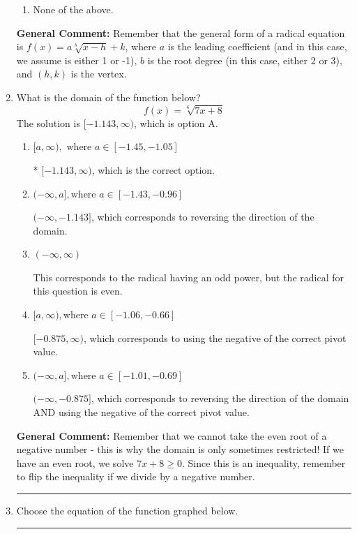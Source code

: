 \documentclass{extbook}[14pt]
\newcommand{\litem}[1]{\item #1

\rule{\textwidth}{0.4pt}}
\begin{document}
\begin{enumerate}
{\begin{enumerate}[label=\Alph*.]
\item None of the above.\end{enumerate}
\textbf{General Comment:} Remember that the general form of a radical equation is $ f(x) = a \sqrt[b]{x - h} + k $, where $a$ is the leading coefficient (and in this case, we assume is either 1 or -1), $b$ is the root degree (in this case, either 2 or 3), and $(h, k)$ is the vertex.
}
\litem{
What is the domain of the function below?
\[ f(x) = \sqrt[6]{7 x + 8} \]The solution is \( [-1.143, \infty) \), which is option A.\begin{enumerate}[label=\Alph*.]
\item \( [a, \infty), \text{ where } a \in [-1.45, -1.05] \)

* $[-1.143, \infty)$, which is the correct option.
\item \( (-\infty, a], \text{where } a \in [-1.43, -0.96] \)

 $(-\infty, -1.143]$, which corresponds to reversing the direction of the domain.
\item \( (-\infty, \infty) \)

This corresponds to the radical having an odd power, but the radical for this question is even.
\item \( [a, \infty), \text{where } a \in [-1.06, -0.66] \)

$[-0.875, \infty)$, which corresponds to using the negative of the correct pivot value.
\item \( (-\infty, a], \text{where } a \in [-1.01, -0.69] \)

$(-\infty, -0.875]$, which corresponds to reversing the direction of the domain AND using the negative of the correct pivot value.
\end{enumerate}

\textbf{General Comment:} Remember that we cannot take the even root of a negative number - this is why the domain is only sometimes restricted! If we have an even root, we solve $7 x + 8 \geq 0$. Since this is an inequality, remember to flip the inequality if we divide by a negative number.
}
\litem{
Choose the equation of the function graphed below.

}
\end{enumerate}
\end{document}
